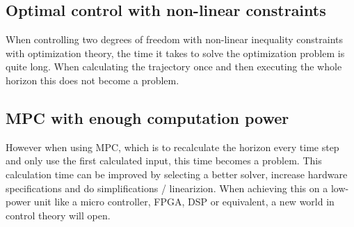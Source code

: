 \subsection{Optimal control with non-linear constraints}
When controlling two degrees of freedom with non-linear inequality constraints with optimization theory, the time it takes to solve the optimization problem is quite long. When calculating the trajectory once and then executing the whole horizon this does not become a problem.

\subsection{MPC with enough computation power}
 However when using MPC, which is to recalculate the horizon every time step and only use the first calculated input, this time becomes a problem. This calculation time can be improved by selecting a better solver, increase hardware specifications and do simplifications / linearizion. When achieving this on a low-power unit like a micro controller, FPGA, DSP or equivalent, a new world in control theory will open.